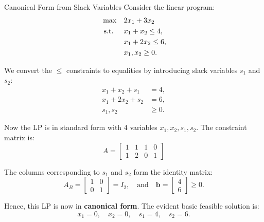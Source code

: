 \begin{example}{Canonical Form from Slack Variables}\label{exa:canonical-slack}
Consider the linear program:
\[
\begin{aligned}
\max \quad & 2x_1 + 3x_2 \\
\mbox{ s.t. } \quad 
& x_1 + x_2 \leq 4, \\
& x_1 + 2x_2 \leq 6, \\
& x_1, x_2 \geq 0.
\end{aligned}
\]

We convert the \( \leq \) constraints to equalities by introducing slack variables \( s_1 \) and \( s_2 \):
\[
\begin{aligned}
x_1 + x_2 + s_1 &= 4, \\
x_1 + 2x_2 + s_2 &= 6, \\
s_1, s_2 &\geq 0.
\end{aligned}
\]

Now the LP is in standard form with 4 variables \( x_1, x_2, s_1, s_2 \). The constraint matrix is:
\[
A = \begin{bmatrix}
1 & 1 & 1 & 0 \\
1 & 2 & 0 & 1
\end{bmatrix}
\]

The columns corresponding to \( s_1 \) and \( s_2 \) form the identity matrix:
\[
A_B = \begin{bmatrix}
1 & 0 \\
0 & 1
\end{bmatrix}
= I_2,
\quad \text{and} \quad
\mathbf{b} = \begin{bmatrix} 4 \\ 6 \end{bmatrix} \geq 0.
\]

Hence, this LP is now in \textbf{canonical form}. The evident basic feasible solution is:
\[
x_1 = 0, \quad x_2 = 0, \quad s_1 = 4, \quad s_2 = 6.
\]
\end{example}

